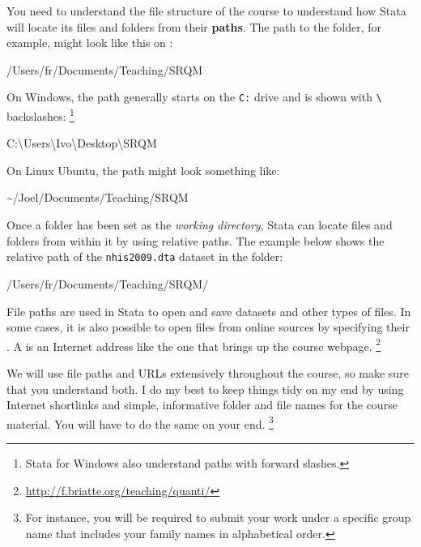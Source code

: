 	You need to understand the file structure of the course to understand how Stata will locate its files and folders from their \textbf{paths}. The path to the \SRQM folder, for example, might look like this on \OSX:\\[1em]%
	
	\begin{docspec}
		/Users/fr/Documents/Teaching/SRQM
	\end{docspec}
	
	On Windows, the path generally starts on the \texttt{C:} drive and is shown with \texttt{\textbackslash} backslashes:%
		\footnote{Stata for Windows also understand paths with forward slashes.}%
    
	\begin{docspec}
		C:\textbackslash{}Users\textbackslash{}Ivo\textbackslash{}Desktop\textbackslash{}SRQM
	\end{docspec}
	
	On Linux Ubuntu, the path might look something like:%
	
	\begin{docspec}
		\textasciitilde/Joel/Documents/Teaching/SRQM
	\end{docspec}
	
	Once a folder has been set as the \emph{working directory}, Stata can locate files and folders from within it by using relative paths. The example below shows the relative path of the \texttt{nhis2009.dta} dataset in the \texttt{\data} folder:\\[1em]%
	
	\begin{docspec}
		/Users/fr/Documents/Teaching/SRQM/
	\end{docspec}

	File paths are used in Stata to open and save datasets and other types of files. In some cases, it is also possible to open files from online sources by specifying their \URL. A \URL is an Internet address like the one that brings up the course webpage.%
		\footnote{\url{http://f.briatte.org/teaching/quanti/}}%
	
	We will use file paths and URLs extensively throughout the course, so make sure that you understand both. I do my best to keep things tidy on my end by using Internet shortlinks and simple, informative folder and file names for the course material. You will have to do the same on your end.%
		\footnote{For instance, you will be required to submit your work under a specific group name that includes your family names in alphabetical order.}%

